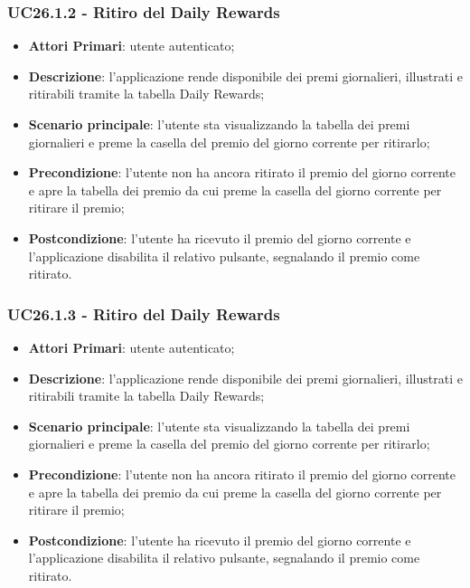 \subsubsection{UC26.1.2 - Ritiro del Daily Rewards}
\begin{itemize}
	\item \textbf{Attori Primari}: utente autenticato;
	\item \textbf{Descrizione}: l'applicazione rende disponibile dei premi giornalieri, illustrati e ritirabili tramite la tabella Daily Rewards;
	\item \textbf{Scenario principale}: l'utente sta visualizzando la tabella dei premi giornalieri e preme la casella del premio del giorno corrente per ritirarlo;
	\item \textbf{Precondizione}: l'utente non ha ancora ritirato il premio del giorno corrente e apre la tabella dei premio da cui preme la casella del giorno corrente per ritirare il premio;
	\item \textbf{Postcondizione}: l'utente ha ricevuto il premio del giorno corrente e l'applicazione disabilita il relativo pulsante, segnalando il premio come ritirato. 
\end{itemize}
\subsubsection{UC26.1.3 - Ritiro del Daily Rewards}
\begin{itemize}
	\item \textbf{Attori Primari}: utente autenticato;
	\item \textbf{Descrizione}: l'applicazione rende disponibile dei premi giornalieri, illustrati e ritirabili tramite la tabella Daily Rewards;
	\item \textbf{Scenario principale}: l'utente sta visualizzando la tabella dei premi giornalieri e preme la casella del premio del giorno corrente per ritirarlo;
	\item \textbf{Precondizione}: l'utente non ha ancora ritirato il premio del giorno corrente e apre la tabella dei premio da cui preme la casella del giorno corrente per ritirare il premio;
	\item \textbf{Postcondizione}: l'utente ha ricevuto il premio del giorno corrente e l'applicazione disabilita il relativo pulsante, segnalando il premio come ritirato. 
\end{itemize}

